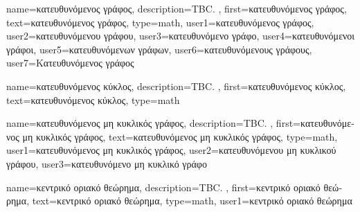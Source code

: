 {name={\foreignlanguage{greek}{κατευθυνόμενος γράφος}},
	description={TBC. },
	first={\foreignlanguage{greek}{κατευθυνόμενος γράφος}},
	text={\foreignlanguage{greek}{κατευθυνόμενος γράφος}},
	type=math,
	user1={\foreignlanguage{greek}{κατευθυνόμενος γράφος}}, %
  	user2={\foreignlanguage{greek}{κατευθυνόμενου γράφου}}, %
	user3={\foreignlanguage{greek}{κατευθυνόμενο γράφο}}, %
	user4={\foreignlanguage{greek}{κατευθυνόμενοι γράφοι}}, %
  	user5={\foreignlanguage{greek}{κατευθυνόμενων γράφων}}, %
	user6={\foreignlanguage{greek}{κατευθυνόμενους γράφους}}, %
	user7={\foreignlanguage{greek}{Κατευθυνόμενος γράφος}} %
}

{name={\foreignlanguage{greek}{κατευθυνόμενος κύκλος}},
	description={TBC. },
	first={\foreignlanguage{greek}{κατευθυνόμενος κύκλος}},
	text={\foreignlanguage{greek}{κατευθυνόμενος κύκλος}},
	type=math
}

{name={\foreignlanguage{greek}{κατευθυνόμενος μη κυκλικός γράφος}},
	description={TBC. }, 
 	first={\foreignlanguage{greek}{κατευθυνόμενος μη κυκλικός γράφος}},
 	text={\foreignlanguage{greek}{κατευθυνόμενος μη κυκλικός γράφος}},
	type=math,
	user1={\foreignlanguage{greek}{κατευθυνόμενος μη κυκλικός γράφος}}, %
  	user2={\foreignlanguage{greek}{κατευθυνόμενου μη κυκλικού γράφου}}, %
	user3={\foreignlanguage{greek}{κατευθυνόμενο μη κυκλικό γράφο}} %
}%

{name={\foreignlanguage{greek}{κεντρικό οριακό θεώρημα}},
	description={TBC. },
	first={\foreignlanguage{greek}{κεντρικό οριακό θεώρημα}},
	text={\foreignlanguage{greek}{κεντρικό οριακό θεώρημα}},
	type=math, 
	user1={\foreignlanguage{greek}{κεντρικό οριακό θεώρημα}} %
}

